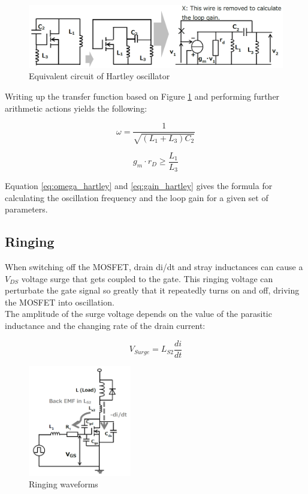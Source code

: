 \begin{figure}[H]
	\centering
	\includegraphics[width=\textwidth]{pictures/theory/hartley_2.PNG}
	\caption{Equivalent circuit of Hartley oscillator}
	\label{fig:hartley_2}
\end{figure}

Writing up the transfer function based on Figure \ref{fig:hartley_2} and performing further arithmetic actions yields the following:


\begin{equation}
    \omega = \frac{1}{\sqrt{(L_1 + L_3)C_2}}
    \label{eq:omega_hartley}
\end{equation}

\begin{equation}
    g_m \cdot r_D \geq \frac{L_1}{L_3}
    \label{eq:gain_hartley}
\end{equation}

Equation \ref{eq:omega_hartley} and \ref{eq:gain_hartley} gives the formula for calculating the oscillation frequency and the loop gain for a given set of parameters.

\subsection{Ringing}
\label{sec:ringing}

When switching off the MOSFET, drain di/dt and stray inductances can cause a $V_{DS}$ voltage surge that gets coupled to the gate. This ringing voltage can perturbate the gate signal so greatly that it repeatedly turns on and off, driving the MOSFET into oscillation. \\

The amplitude of the surge voltage depends on the value of the parasitic inductance and the changing rate of the drain current:

\begin{equation}
    V_{Surge} = L_{S2} \frac{di}{dt}
\end{equation}

\begin{figure}[H]
	\centering
	\includegraphics[width=0.4\textwidth]{pictures/theory/ringing_coupling.PNG}
	\caption{Ringing waveforms}
	\label{fig:ringing_coupling}
\end{figure}

